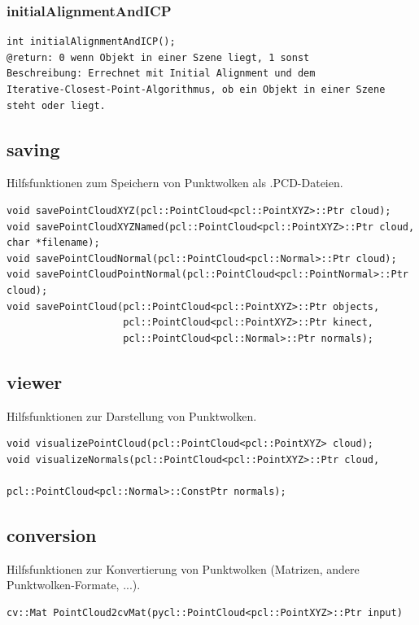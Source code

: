 \documentclass{suturo}
\begin{document}
\subsubsection{initialAlignmentAndICP}
\begin{verbatim}
int initialAlignmentAndICP();
@return: 0 wenn Objekt in einer Szene liegt, 1 sonst
Beschreibung: Errechnet mit Initial Alignment und dem
Iterative-Closest-Point-Algorithmus, ob ein Objekt in einer Szene steht oder liegt.
\end{verbatim}\label{func:initialalignmentandicp}


\subsection{saving}
Hilfsfunktionen zum Speichern von Punktwolken als .PCD-Dateien.

\begin{verbatim}
void savePointCloudXYZ(pcl::PointCloud<pcl::PointXYZ>::Ptr cloud);
void savePointCloudXYZNamed(pcl::PointCloud<pcl::PointXYZ>::Ptr cloud, char *filename);
void savePointCloudNormal(pcl::PointCloud<pcl::Normal>::Ptr cloud);
void savePointCloudPointNormal(pcl::PointCloud<pcl::PointNormal>::Ptr cloud);
void savePointCloud(pcl::PointCloud<pcl::PointXYZ>::Ptr objects,
                    pcl::PointCloud<pcl::PointXYZ>::Ptr kinect,
                    pcl::PointCloud<pcl::Normal>::Ptr normals);
\end{verbatim}

\subsection{viewer}
Hilfsfunktionen zur Darstellung von Punktwolken.

\begin{verbatim}
void visualizePointCloud(pcl::PointCloud<pcl::PointXYZ> cloud);
void visualizeNormals(pcl::PointCloud<pcl::PointXYZ>::Ptr cloud, 			 	
									pcl::PointCloud<pcl::Normal>::ConstPtr normals);
\end{verbatim}

\subsection{conversion}
Hilfsfunktionen zur Konvertierung von Punktwolken (Matrizen, andere Punktwolken-Formate, ...).

\begin{verbatim}
cv::Mat PointCloud2cvMat(pycl::PointCloud<pcl::PointXYZ>::Ptr input)
\end{verbatim}
\end{document}
